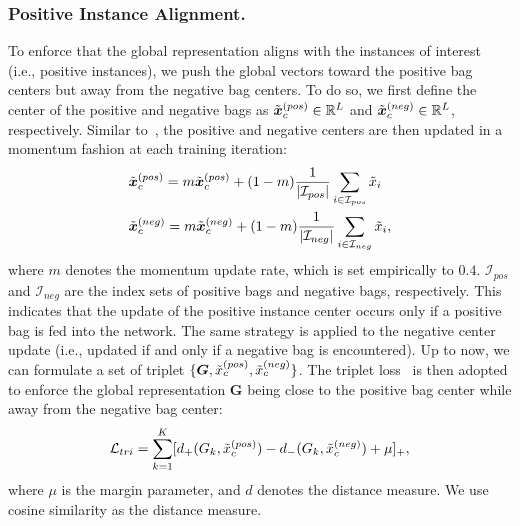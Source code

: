 \documentclass[runningheads]{llncs}
\begin{document}
\subsubsection{Positive Instance Alignment.} To enforce that the global representation aligns with the instances of interest (i.e., positive instances), we push the global vectors toward the positive bag centers but away from the negative bag centers. To do so, we first define the center of the positive and negative bags as $\Tilde{\boldsymbol{x}}_{c}^{(pos)} \in \mathbb{R}^{L}$ and $\Tilde{\boldsymbol{x}}_{c}^{(neg)} \in \mathbb{R}^{L}$, respectively. Similar to~\cite{he2020momentum}, the positive and negative centers are then updated in a momentum fashion at each training iteration:
\begin{equation}
\begin{split}
    &\Tilde{\boldsymbol{x}}_{c}^{(pos)} = m\Tilde{\boldsymbol{x}}_{c}^{(pos)} + (1- m) \frac{1}{|\mathcal{I}_{pos}|}\sum_{i \in \mathcal{I}_{pos}} \Tilde{x}_i \\
    &\Tilde{\boldsymbol{x}}_{c}^{(neg)} = m\Tilde{\boldsymbol{x}}_{c}^{(neg)} + (1- m) \frac{1}{|\mathcal{I}_{neg}|}\sum_{i \in \mathcal{I}_{neg}} \Tilde{x}_{i}, \\
\end{split}
\end{equation}
where $m$ denotes the momentum update rate, which is set empirically to $0.4$. $\mathcal{I}_{pos}$ and $\mathcal{I}_{neg}$ are the index sets of positive bags and negative bags, respectively. This indicates that the update of the positive instance center occurs only if a positive bag is fed into the network. The same strategy is applied to the negative center update (i.e., updated if and only if a negative bag is encountered). Up to now, we can formulate a set of triplet $\{\boldsymbol{G}, \Tilde{x}_c^{(pos)}, \Tilde{x}_c^{(neg)} \}$. 
The triplet loss~\cite{tripleloss} is then adopted to enforce the global representation $\boldsymbol{G}$ being close to the positive bag center while away from the negative bag center:
\begin{equation}
    \mathcal{L}_{tri} = \sum_{k=1}^{K} [d_+ (G_k, \Tilde{x}_c^{(pos)}) -  d_- (G_k, \Tilde{x}_c^{(neg)}) + \mu]_+,
\end{equation}
where $\mu$ is the margin parameter, and $d$ denotes the distance measure. We use cosine similarity as the distance measure.
\end{document}
